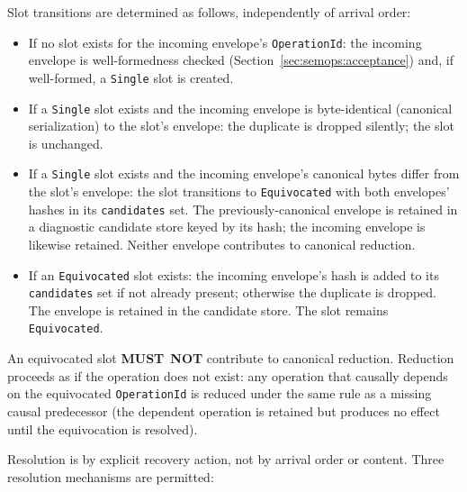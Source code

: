 \documentclass[11pt,letterpaper]{report}
\newcounter{requirement}[chapter]
\newcommand{\MUSTNOT}{\textbf{MUST}\nobreak\ \textbf{NOT}}
\begin{document}
\begin{requirement}
  \label{req:semops:operation-equivocation}
  Slot transitions are determined as follows, independently of
  arrival order:

  \begin{itemize}
    \item If no slot exists for the incoming envelope's
      \texttt{OperationId}: the incoming envelope is
      well-formedness checked
      (Section~\ref{sec:semops:acceptance}) and, if well-formed,
      a \texttt{Single} slot is created.
    \item If a \texttt{Single} slot exists and the incoming
      envelope is byte-identical (canonical serialization) to
      the slot's envelope: the duplicate is dropped silently;
      the slot is unchanged.
    \item If a \texttt{Single} slot exists and the incoming
      envelope's canonical bytes differ from the slot's
      envelope: the slot transitions to \texttt{Equivocated} with
      both envelopes' hashes in its \texttt{candidates} set. The
      previously-canonical envelope is retained in a diagnostic
      candidate store keyed by its hash; the incoming envelope is
      likewise retained. Neither envelope contributes to canonical
      reduction.
    \item If an \texttt{Equivocated} slot exists: the incoming
      envelope's hash is added to its \texttt{candidates} set if
      not already present; otherwise the duplicate is dropped.
      The envelope is retained in the candidate store. The slot
      remains \texttt{Equivocated}.
  \end{itemize}

  An equivocated slot \MUSTNOT{} contribute to canonical
  reduction. Reduction proceeds as if the operation does not
  exist: any operation that causally depends on the equivocated
  \texttt{OperationId} is reduced under the same rule as a
  missing causal predecessor (the dependent operation is
  retained but produces no effect until the equivocation is
  resolved).

  Resolution is by explicit recovery action, not by arrival
  order or content. Three resolution mechanisms are permitted:


\end{requirement}
\end{document}
